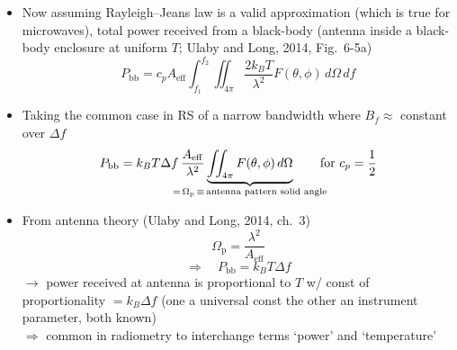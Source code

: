 \documentclass[11pt, oneside]{article}
\newcommand{\Aeff}{A_\mathrm{eff}}
\begin{document}
\begin{itemize}
	\item Now assuming Rayleigh--Jeans law is a valid approximation (which is true for microwaves), total power received from a black-body (antenna inside a black-body enclosure at uniform $T$; Ulaby and Long, 2014, Fig.~6-5a)
	\begin{equation}
		\label{e:Pbb1}
		P_\mathrm{bb} = c_p\Aeff\int_{f_1}^{f_2}\iint_{4\pi}\frac{2k_BT}{\lambda^2}F(\theta,\phi)\,d\Omega\,df
	\end{equation}
	\item Taking the common case in RS of a narrow bandwidth where $B_f \approx$ constant over $\Delta f$
	\begin{equation}
		\label{e:Pbb2}
		P_\mathrm{bb} = k_BT\Delta f\,\frac{\Aeff}{\lambda^2}\underbrace{\iint_{4\pi}F(\theta,\phi)\,d\Omega}_{\mathclap{=\,\Omega_\mathrm{p}\,\equiv\,\text{antenna pattern solid angle}}} \qquad \text{for } c_p = \frac{1}{2}
	\end{equation}
	\item From antenna theory (Ulaby and Long, 2014, ch.~3)
	\begin{equation}
		\label{e:Op}
		\Omega_\mathrm{p} = \frac{\lambda^2}{\Aeff}
	\end{equation}
	\begin{equation}
		\label{e:Pbb}
		\Rightarrow\quad \boxed{P_\mathrm{bb} = k_BT\Delta f}
	\end{equation}
	$\rightarrow$ power received at antenna is proportional to $T$ w/ const of proportionality $= k_B\Delta f$ (one a universal const the other an instrument parameter, both known)\\
	$\Rightarrow$ common in radiometry to interchange terms `power' and `temperature'
\end{itemize}
\end{document}
